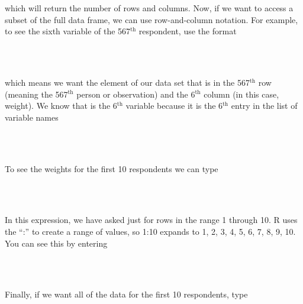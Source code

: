 \documentclass[11pt]{article}
\begin{document}
which will return the number of rows and columns. Now, if we want to access a subset of the full data frame, we can use row-and-column notation. For example, to see the sixth variable of the 567$^{\textrm{th}}$ respondent, use the format

\ttfamily\noindent
\hlstd{}\hspace*{\fill}\\
\hlstd{}\hlkeyword{[}\hlkeyword{,}\hlkeyword{]}\hspace*{\fill}\\
\normalfont

which means we want the element of our data set that is in the 567$^{\textrm{th}}$ row (meaning the 567$^{\textrm{th}}$ person or observation) and the 6$^{\textrm{th}}$ column (in this case, weight). We know that \texttt{} is the 6$^{\textrm{th}}$ variable because it is the 6$^{\textrm{th}}$ entry in the list of variable names

\ttfamily\noindent
\hlstd{}\hspace*{\fill}\\
\hlstd{}\hlkeyword{(}\hlkeyword{)}\hspace*{\fill}\\
\normalfont

To see the weights for the first 10 respondents we can type

\ttfamily\noindent
\hlstd{}\hspace*{\fill}\\
\hlstd{}\hlkeyword{[}\hlkeyword{:}\hlkeyword{,}\hlkeyword{]}\hspace*{\fill}\\
\normalfont

In this expression, we have asked just for rows in the range 1 through 10.  R uses the ``:'' to create a range of values, so 1:10 expands to 1, 2, 3, 4, 5, 6, 7, 8, 9, 10. You can see this by entering

\ttfamily\noindent
\hlstd{}\hspace*{\fill}\\
\hlstd{}\hlkeyword{:}\hspace*{\fill}\\
\normalfont

Finally, if we want all of the data for the first 10 respondents, type

\ttfamily\noindent
\hlstd{}\hspace*{\fill}\\
\hlstd{}\hlkeyword{[}\hlkeyword{:}\hlkeyword{,}\hlkeyword{]}\hspace*{\fill}\\
\normalfont
\end{document}
